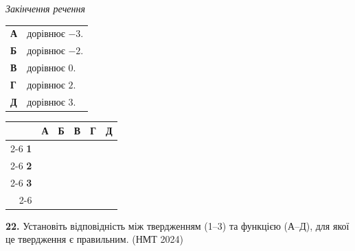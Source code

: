 \documentclass[14pt]{extarticle}
\newcommand{\nmtyear}[1]{\hfill{\small\color{yearcolor}(НМТ #1)}}
\begin{document}
\noindent
\begin{minipage}[t]{0.55\textwidth}
    \textit{Закінчення речення} \par \vspace{0.2cm}
    \begin{tabular}{ll}
    \textbf{А} & дорівнює $-3$. \\
    \textbf{Б} & дорівнює $-2$. \\
    \textbf{В} & дорівнює $0$. \\
    \textbf{Г} & дорівнює $2$. \\
    \textbf{Д} & дорівнює $3$. \\
    \end{tabular}
\end{minipage}%
\hfill
\begin{minipage}[t]{0.40\textwidth}
    \vspace{0.5cm} %
    \begin{flushright}
    \begingroup
    \setlength{\tabcolsep}{4pt}
    \renewcommand{\arraystretch}{1.2}
    \small
    \begin{tabular}{r|c|c|c|c|c|}
         \multicolumn{1}{c}{} & \multicolumn{1}{c}{\textbf{А}} & \multicolumn{1}{c}{\textbf{Б}} & \multicolumn{1}{c}{\textbf{В}} & \multicolumn{1}{c}{\textbf{Г}} & \multicolumn{1}{c}{\textbf{Д}} \\ \cline{2-6}
         \textbf{1} & & & & & \\ \cline{2-6}
         \textbf{2} & & & & & \\ \cline{2-6}
         \textbf{3} & & & & & \\ \cline{2-6}
    \end{tabular}
    \endgroup
    \end{flushright}
\end{minipage}

\vspace{0.7cm}
\noindent\textbf{22.} Установіть відповідність між твердженням (1--3) та функцією (А--Д), для якої це твердження є правильним. \nmtyear{2024}

\vspace{0.3cm}
\end{document}
